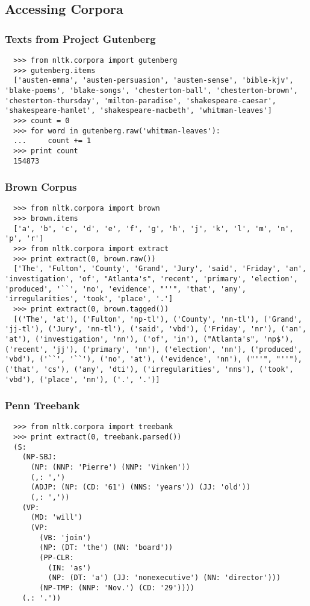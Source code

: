 \documentclass{beamer}             %
\begin{document}
\subsection{Accessing Corpora}

\begin{frame}[fragile]
\frametitle{Texts from Project Gutenberg}

\begin{verbatim}
  >>> from nltk.corpora import gutenberg
  >>> gutenberg.items
  ['austen-emma', 'austen-persuasion', 'austen-sense', 'bible-kjv', 'blake-poems', 'blake-songs', 'chesterton-ball', 'chesterton-brown', 'chesterton-thursday', 'milton-paradise', 'shakespeare-caesar', 'shakespeare-hamlet', 'shakespeare-macbeth', 'whitman-leaves']
  >>> count = 0
  >>> for word in gutenberg.raw('whitman-leaves'):
  ...     count += 1
  >>> print count
  154873
\end{verbatim}
\end{frame}

\begin{frame}[fragile]
\frametitle{Brown Corpus}
\small

\begin{verbatim}
  >>> from nltk.corpora import brown
  >>> brown.items
  ['a', 'b', 'c', 'd', 'e', 'f', 'g', 'h', 'j', 'k', 'l', 'm', 'n', 'p', 'r']
  >>> from nltk.corpora import extract
  >>> print extract(0, brown.raw())
  ['The', 'Fulton', 'County', 'Grand', 'Jury', 'said', 'Friday', 'an', 'investigation', 'of', "Atlanta's", 'recent', 'primary', 'election', 'produced', '``', 'no', 'evidence', "''", 'that', 'any', 'irregularities', 'took', 'place', '.']
  >>> print extract(0, brown.tagged())
  [('The', 'at'), ('Fulton', 'np-tl'), ('County', 'nn-tl'), ('Grand', 'jj-tl'), ('Jury', 'nn-tl'), ('said', 'vbd'), ('Friday', 'nr'), ('an', 'at'), ('investigation', 'nn'), ('of', 'in'), ("Atlanta's", 'np$'), ('recent', 'jj'), ('primary', 'nn'), ('election', 'nn'), ('produced', 'vbd'), ('``', '``'), ('no', 'at'), ('evidence', 'nn'), ("''", "''"), ('that', 'cs'), ('any', 'dti'), ('irregularities', 'nns'), ('took', 'vbd'), ('place', 'nn'), ('.', '.')]
\end{verbatim}
\end{frame}


\begin{frame}[fragile]
\frametitle{Penn Treebank}
\small

\begin{verbatim}
  >>> from nltk.corpora import treebank
  >>> print extract(0, treebank.parsed())
  (S:
    (NP-SBJ:
      (NP: (NNP: 'Pierre') (NNP: 'Vinken'))
      (,: ',')
      (ADJP: (NP: (CD: '61') (NNS: 'years')) (JJ: 'old'))
      (,: ','))
    (VP:
      (MD: 'will')
      (VP:
        (VB: 'join')
        (NP: (DT: 'the') (NN: 'board'))
        (PP-CLR:
          (IN: 'as')
          (NP: (DT: 'a') (JJ: 'nonexecutive') (NN: 'director')))
        (NP-TMP: (NNP: 'Nov.') (CD: '29'))))
    (.: '.'))
\end{verbatim}
\end{frame}
\end{document}
